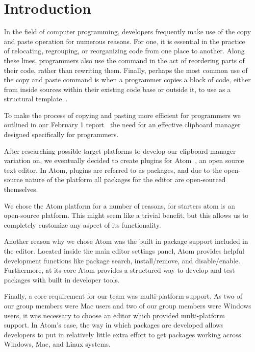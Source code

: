 \documentclass{acm_proc_article-sp}
\begin{document}

\section{Introduction}\label{sec:intro}

In the field of computer programming, developers frequently make use of the copy and paste operation for numerous reasons. For one, it is essential in the practice of relocating, regrouping, or reorganizing code from one place to another. Along these lines, programmers also use the command in the act of reordering parts of their code, rather than rewriting them. Finally, perhaps the most common use of the copy and paste command is when a programmer copies a block of code, either from inside sources within their existing code base or outside it, to use as a structural template~\cite{ooplCP}.

To make the process of copying and pasting more efficient for programmers we outlined in our February 1 report~\cite{janReport} the need for an effective clipboard manager designed specifically for programmers.

After researching possible target platforms to develop our clipboard manager variation on, we eventually decided to create plugins for Atom~\cite{Atom}, an open source text editor. In Atom, plugins are referred to as packages, and due to the open-source nature of the platform all packages for the editor are open-sourced themselves. 

We chose the Atom platform for a number of reasons, for starters atom is an open-source platform. This might seem like a trivial benefit, but this allows us to completely customize any aspect of its functionality. 

Another reason why we chose Atom was the built in package support included in the editor. Located inside the main editor settings panel, Atom provides helpful development functions like package search, install/remove, and disable/enable. Furthermore, at its core Atom provides a structured way to develop and test packages with built in developer tools.

Finally, a core requirement for our team was multi-platform support. As two of our group members were Mac users and two of our group members were Windows users, it was necessary to choose an editor which provided multi-platform support. In Atom's case, the way in which packages are developed allows developers to put in relatively little extra effort to get packages working across Windows, Mac, and Linux systems. 
\end{document}
